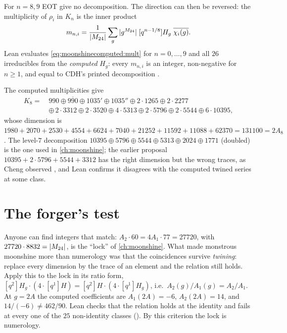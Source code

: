 For $n=8,9$ EOT give no decomposition. The direction can then be reversed: the
multiplicity of $\rho_i$ in $K_n$ is the inner product
\begin{equation}\label{eq:moonshinecomputed:mult}
  m_{n,i}=\frac1{|M_{24}|}\sum_g|g^{M_{24}}|\;[q^{n-1/8}]H_g\;\overline{\chi_i(g)}.
\end{equation}
Lean evaluates \eqref{eq:moonshinecomputed:mult} for $n=0,\dots,9$ and all $26$ irreducibles
from the \emph{computed} $H_g$: every $m_{n,i}$ is an integer, non-negative for $n\ge1$,
and equal to CDH's printed decomposition .

\begin{example}[Level $8$]
The computed multiplicities give
\begin{align*}
  K_8=\ &990\oplus\overline{990}\oplus1035'\oplus1035''\oplus2\cdot1265\oplus2\cdot2277\\
  &\oplus\,2\cdot3312\oplus2\cdot3520\oplus4\cdot5313\oplus2\cdot5796\oplus2\cdot5544
   \oplus6\cdot10395,
\end{align*}
whose dimension is $1980+2070+2530+4554+6624+7040+21252+11592+11088+62370=131100
=2A_8$. The level-$7$ decomposition $10395\oplus5796\oplus5544\oplus5313\oplus2024\oplus1771$
(doubled) is the one used in \cref{ch:moonshine}; the earlier proposal
$10395+2\cdot5796+5544+3312$ has the right dimension but the wrong traces, as Cheng
observed , and Lean confirms it disagrees with the computed
twined series at some class.
\end{example}

\section{The forger's test}\label{sec:moonshinecomputed:forger}

Anyone can find integers that match: $A_2\cdot60=4A_1\cdot77=27720$, with
$27720\cdot8832=|M_{24}|$, is the ``lock'' of \cref{ch:moonshine}. What made monstrous
moonshine more than numerology was that the coincidences survive \emph{twining}: replace
every dimension by the trace of an element and the relation still holds.
Apply this to the lock in its ratio form,
$[q^2]H_g\cdot(4\cdot[q^1]H)=[q^2]H\cdot(4\cdot[q^1]H_g)$, i.e.\ $A_2(g)/A_1(g)=A_2/A_1$.
At $g=2A$ the computed coefficients are $A_1(2A)=-6$, $A_2(2A)=14$, and $14/(-6)\neq
462/90$. Lean checks that the relation holds at the identity and fails at every one of the
$25$ non-identity classes (\TA). By this criterion the lock is numerology.

